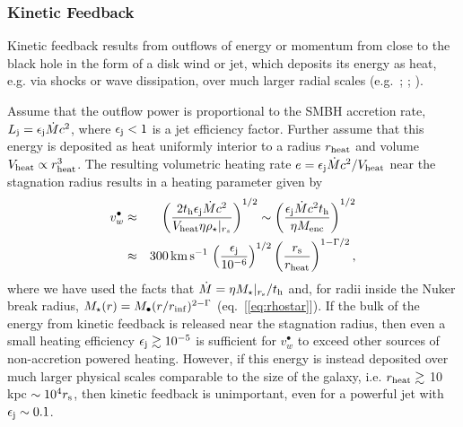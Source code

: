 \documentclass[usenatbib,fleqn]{mn2e}
\begin{document}
\subsubsection{Kinetic Feedback}

Kinetic feedback results from outflows of energy or momentum from close to the black hole in the form of a disk wind or jet, which deposits its energy as heat, e.g. via shocks or wave dissipation, over much larger radial scales (e.g.~\citealt{McNamara&Nulsen07}; \citealt{Novak+11}; \citealt{Gaspari+12}).  

Assume that the outflow power is proportional to the SMBH accretion rate, $L_{\rm j} =
\epsilon_{\rm j} \dot{M}c^{2}$, where $\epsilon_{\rm j} < 1$ is a jet efficiency factor.  Further assume that this energy is deposited as heat uniformly interior to a radius $r_{\rm heat}$ and volume $V_{\rm heat} \propto r_{\rm
heat}^{3}$.  The resulting volumetric heating rate $e = \epsilon_{\rm
j}\dot{M}c^{2}/V_{\rm heat}$ near the stagnation radius results in a heating parameter given by
\begin{eqnarray} v_{w}^{\bullet} &\approx& \left(\frac{2t_{\rm
h}\epsilon_{\rm j}\dot{M}c^{2}}{V_{\rm heat}\eta
\rho_{\star}|_{r_{s}}}\right)^{1/2} \sim \left(\frac{\epsilon_{\rm
j}\dot{M}c^{2}t_{\rm h}}{\eta M_{\rm enc}}\right)^{1/2} \nonumber \\
&\approx& 300\,{\rm km\,s^{-1}}\,\left(\frac{\epsilon_{\rm j}}{10^{-6}}\right)^{1/2}\left(\frac{r_{\rm s}}{r_{\rm
heat}}\right)^{1-\Gamma/2},
\label{eq:vjet}
\end{eqnarray} 
where we have used the facts that $\dot{M} = \eta M_{\star}|_{r_{\rm s}}/t_{\rm h}$ and, for radii inside the Nuker break radius, $M_{\star}(r) =
M_{\bullet}(r/r_{\rm inf})^{2-\Gamma}$ (eq.~[\ref{eq:rhostar}]).  If the bulk of the energy from kinetic feedback is released near the stagnation radius, then even a small heating efficiency $\epsilon_{\rm j} \gtrsim
10^{-5}$ is sufficient for $v_{w}^{\bullet}$ to exceed other sources of non-accretion powered heating.  However, if this energy is instead deposited over much larger physical scales comparable to the size of the galaxy, i.e. $r_{\rm heat} \gtrsim $ 10 kpc $\sim 10^{4}r_{\rm s}$, then kinetic feedback is unimportant, even for a powerful jet with $\epsilon_{\rm j} \sim 0.1$.  
\end{document}
